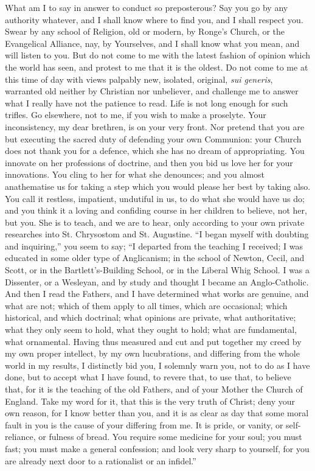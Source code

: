 What am I to say in answer to conduct so preposterous? Say you go
by any authority whatever, and I shall know where to find you, and I
shall respect you. Swear by any school of Religion, old or modern, by
Ronge's Church, or the Evangelical Alliance, nay, by Yourselves, and I
shall know what you mean, and will listen to you. But do not come to
me with the latest fashion of opinion which the world has seen, and
protest to me that it is the oldest. Do not come to me at this time of
day with views palpably new, isolated, original, \emph{sui generis},
warranted old neither by Christian nor unbeliever, and challenge me to
answer what I really have not the patience to read. Life is not long
enough for such trifles. Go elsewhere, not to me, if you wish to make
a proselyte. Your inconsistency, my dear brethren, is on your very
front. Nor pretend that you are but executing the sacred duty of
defending your own Communion: your Church does not thank you for a
defence, which she has no dream of appropriating. You innovate on her
professions of doctrine, and then you bid us love her for your
innovations. You cling to her for what she denounces; and you almost
anathematise us for taking a step which you would please her best by
taking also. You call it restless, impatient, undutiful in us, to do
what she would have us do; and you think it a loving and confiding
course in her children to believe, not her, but you. She is to teach,
and we are to hear, only according to your own private researches into
St. Chrysostom and St. Augustine. ``I began myself with doubting
and inquiring,'' you seem to say; ``I departed from the
teaching I received; I was educated in some older type of Anglicanism;
in the school of Newton, Cecil, and Scott, or in the
Bartlett's-Building School, or in the Liberal Whig School. I was a
Dissenter, or a Wesleyan, and by study and thought I became an
Anglo-Catholic. And then I read the Fathers, and I have determined
what works are genuine, and what are not; which of them apply to all
times, which are occasional; which historical, and which doctrinal;
what opinions are private, what authoritative; what they only seem to
hold, what they ought to hold; what are fundamental, what ornamental.
Having thus measured and cut and put together my creed by my own
proper intellect, by my own lucubrations, and differing from the whole
world in my results, I distinctly bid you, I solemnly warn you, not to
do as I have done, but to accept what I have found, to revere that, to
use that, to believe that, for it is the teaching of the old Fathers,
and of your Mother the Church of England. Take my word for it, that
this is the very truth of Christ; deny your own reason, for I know
better than you, and it is as clear as day that some moral fault in
you is the cause of your differing from me. It is pride, or vanity, or
self-reliance, or fulness of bread. You require some medicine for your
soul; you must fast; you must make a general confession; and look very
sharp to yourself, for you are already next door to a rationalist or
an infidel.''

